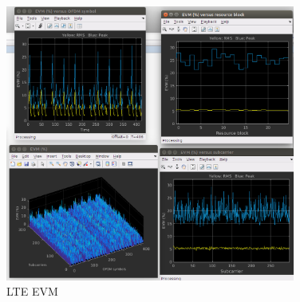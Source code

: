 \begin{figure}[htbp]
    \centering
    \includegraphics[width=0.85\textwidth]{./figures/lte_evm_iio}
    \caption{ LTE EVM
    \label{fig:lteevmiio}}
\end{figure}

\vfill
\clearpage
